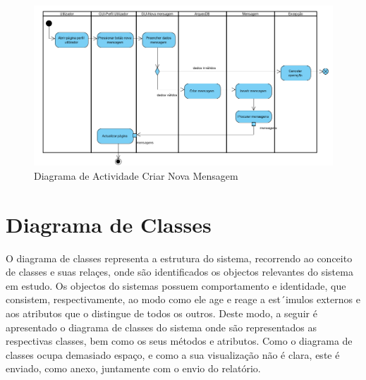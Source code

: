 ﻿\documentclass[12pt,a4paper]{article}
\begin{document}
\begin{figure}[h!]
\centering
\includegraphics[scale=0.6]{actividade/novamensagem}
\caption{Diagrama de Actividade Criar Nova Mensagem} 
\end{figure} 

\clearpage
\section{Diagrama de Classes}
O diagrama de classes representa a estrutura do sistema, recorrendo ao conceito de classes
e suas relaçes, onde são identificados os objectos relevantes do sistema em estudo. Os objectos do sistemas possuem comportamento e identidade, que consistem, respectivamente, ao modo como ele age e reage a est´imulos externos e aos atributos que o distingue de todos os outros.
Deste modo, a seguir é apresentado o diagrama de classes do sistema onde são representados as respectivas classes, bem como os seus métodos e atributos. Como o diagrama de classes ocupa demasiado espaço, e como  a sua visualização não é clara, este é enviado, como anexo, juntamente com o envio do relatório.\\
\end{document}
